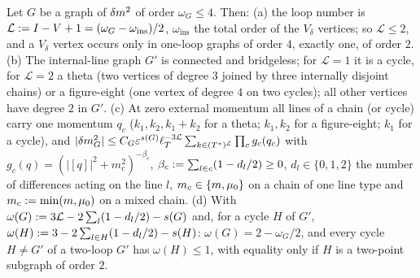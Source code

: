 \begin{lemma}\label{lem:a06e:M3}
Let $G$ be a graph of $\delta m^2$ of order $\omega_G\le4$. Then: \textup{(a)} the loop number is $\mathcal L:= I-V+1=(\omega_G-\omega_{\mathrm{ins}})/2$, $\omega_{\mathrm{ins}}$ the total order of the $V_\delta$ vertices; so $\mathcal L\le2$, and a $V_\delta$ vertex occurs only in one-loop graphs of order $4$, exactly one, of order $2$. \textup{(b)} The internal-line graph $G'$ is connected and bridgeless; for $\mathcal L=1$ it is a cycle, for $\mathcal L=2$ a theta (two vertices of degree $3$ joined by three internally disjoint chains) or a figure-eight (one vertex of degree $4$ on two cycles); all other vertices have degree $2$ in $G'$. \textup{(c)} At zero external momentum all lines of a chain (or cycle) carry one momentum $q_c$ ($k_1,k_2,k_1+k_2$ for a theta; $k_1,k_2$ for a figure-eight; $k_1$ for a cycle), and $|\delta m^2_G|\le C_G\varepsilon^{s(G)}\ell_T^{-3\mathcal L}\sum_{k\in(T^*)^{\mathcal L}}\prod_cg_c(q_c)$ with $g_c(q)=(|[q]|^2+m_c^2)^{-\beta_c}$, $\beta_c:=\sum_{l\in c}(1-d_l/2)\ge0$, $d_l\in\{0,1,2\}$ the number of differences acting on the line $l$, $m_c\in\{m,\mu_0\}$ on a chain of one line type and $m_c:=\min(m,\mu_0)$ on a mixed chain. \textup{(d)} With $\omega(G):=3\mathcal L-2\sum_l(1-d_l/2)-s(G)$ and, for a cycle $H$ of $G'$, $\omega(H):=3-2\sum_{l\in H}(1-d_l/2)-s(H)$: $\omega(G)=2-\omega_G/2$, and every cycle $H\ne G'$ of a two-loop $G'$ has $\omega(H)\le1$, with equality only if $H$ is a two-point subgraph of order $2$.
\end{lemma}

